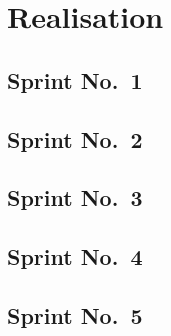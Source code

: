 \section{Realisation}
\label{sec:realization}



\cleardoublepage
\subsection{Sprint No.~1}


\cleardoublepage
\subsection{Sprint No.~2}


\cleardoublepage
\subsection{Sprint No.~3}


\cleardoublepage
\subsection{Sprint No.~4}


\cleardoublepage

\subsection{Sprint No.~5}


